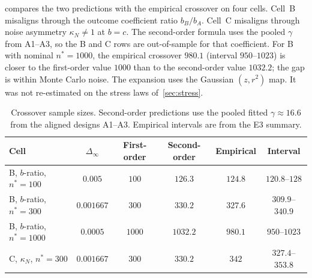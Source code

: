  compares the two predictions with the empirical crossover on four cells.
Cell~B misaligns through the outcome coefficient ratio $b_B/b_A$.
Cell~C misaligns through noise asymmetry $\kappa_N\neq 1$ at $b=c$.
The second-order formula uses the pooled $\gamma$ from A1--A3, so the B and C rows are out-of-sample for that coefficient.
For B with nominal $n^*=1000$, the empirical crossover $980.1$ (interval $950$--$1023$) is closer to the first-order value $1000$ than to the second-order value $1032.2$; the gap is within Monte Carlo noise.
The expansion uses the Gaussian $(z,r^2)$ map.
It was not re-estimated on the stress laws of~\cref{sec:stress}.

\begin{table}[t]
  \centering
  \caption{Crossover sample sizes.
           Second-order predictions use the pooled fitted $\gamma\approx 16.6$ from the aligned designs A1--A3.
           Empirical intervals are from the E3 summary.}
  \label{tab:crossover}
  \begin{tabular}{@{}lccccc@{}}
    \toprule
    Cell & $\Delta_\infty$ & First-order & Second-order & Empirical & Interval \\
    \midrule
    B, $b$-ratio, $n^*=100$  & $0.005$    & $100$  & $126.3$  & $124.8$ & $120.8$--$128$ \\
    B, $b$-ratio, $n^*=300$  & $0.001667$ & $300$  & $330.2$  & $327.6$ & $309.9$--$340.9$ \\
    B, $b$-ratio, $n^*=1000$ & $0.0005$   & $1000$ & $1032.2$ & $980.1$ & $950$--$1023$ \\
    C, $\kappa_N$, $n^*=300$ & $0.001667$ & $300$ & $330.2$ & $342$ & $327.4$--$353.8$ \\
    \bottomrule
  \end{tabular}
\end{table}
